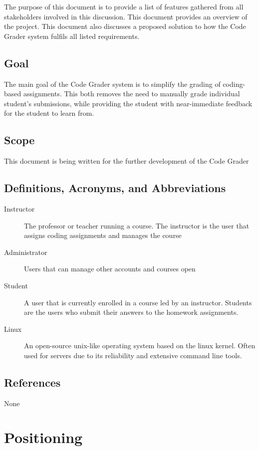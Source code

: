 \documentclass{article}
\begin{document}
The purpose of this document is to provide a list of features gathered from all stakeholders involved in this discussion. This document provides an overview of the project. This document also discusses a proposed solution to how the Code Grader system fulfils all listed requirements.

\subsection{Goal}

The main goal of the Code Grader system is to simplify the grading of coding-based assignments. This both removes the need to manually grade individual student's submissions, while providing the student with near-immediate feedback for the student to learn from.

\subsection{Scope}

This document is being written for the further development of the Code Grader

\subsection{Definitions, Acronyms, and Abbreviations}
\begin{description}
  \item[Instructor] The professor or teacher running a course. The instructor is the user that assigns coding assignments and manages the course
  \item[Administrator] Users that can manage other accounts and courses open
  \item[Student] A user that is currently enrolled in a course led by an instructor. Students are the users who submit their answers to the homework assignments.
  \item[Linux] An open-source unix-like operating system based on the linux kernel. Often used for servers due to its reliability and extensive command line tools.
\end{description}



\subsection{References}
None

\section{Positioning}
\end{document}
